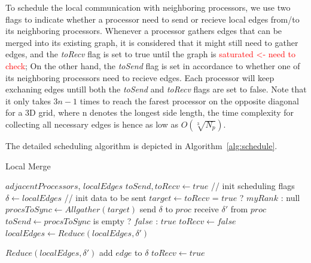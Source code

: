 \documentclass[10pt, conference, compsocconf]{IEEEtran}
\begin{document}
To schedule the local communication with neighboring processors, we use two flags to indicate whether a processor need to send or recieve local edges from/to its neighboring processors. Whenever a processor gathers edges that can be merged into its existing graph, it is considered that it might still need to gather edges, and the \emph{toRecv} flag is set to true until the graph is \textcolor{red}{saturated <- need to check}; On the other hand, the \emph{toSend} flag is set in accordance to whether one of its neighboring processors need to recieve edges. Each processor will keep exchaning edges untill both the \emph{toSend} and \emph{toRecv} flags are set to false. Note that it only takes ${3n-1}$ times to reach the farest processor on the opposite diagonal for a 3D grid, where n denotes the longest side length, the time complexity for collecting all necessary edges is hence as low as ${O(\sqrt[3]{N_p})}$.

The detailed scheduling algorithm is depicted in Algorithm~\ref{alg:schedule}.
\begin{algorithm}
\caption{Local Merge}
\label{alg:schedule}
  \begin{algorithmic}[1]
  \REQUIRE $adjacentProcessors$, $localEdges$
  \STATE $toSend, toRecv \leftarrow true$	// init scheduling flags
  \STATE $\delta \leftarrow localEdges$	// init data to be sent
  	\STATE $target \leftarrow toRecv$ = $true$ ? $myRank$ : null
  	\STATE $procsToSync \leftarrow Allgather(target)$
  			\STATE send $\delta$ to $proc$
  		\ENDIF
  			\STATE receive $\delta\prime$ from $proc$
  		\ENDIF
  	\ENDFOR
  	\STATE $toSend \leftarrow procsToSync$ is empty ? $false$ : $true$
  	\STATE $toRecv \leftarrow false$
  	\STATE $localEdges \leftarrow Reduce(localEdges, \delta\prime)$
  \ENDWHILE
  \end{algorithmic}
  \begin{algorithmic} \STATE \end{algorithmic}	%
  \begin{algorithmic}[1]
  \STATE $Reduce(localEdges, \delta\prime)$
  			\STATE add $edge$ to $\delta$
  			\STATE $toRecv \leftarrow true$
  		\ENDIF
  	\ENDFOR	
  \end{algorithmic}
\end{algorithm}
\end{document}
